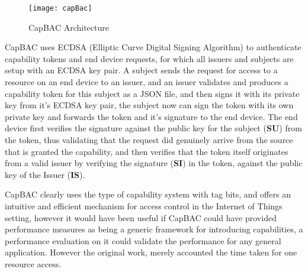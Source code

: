 \begin{figure}[h]
\centering
\texttt{[image: capBac]}
\caption{CapBAC Architecture }
\label{fig:capbac}
\end{figure}

CapBAC uses ECDSA (Elliptic Curve Digital Signing Algorithm) to authenticate capability tokens and end device requests, for which all issuers and subjects are setup with an ECDSA key pair. A subject sends the request for access to a resource on an end device to an issuer, and an issuer validates and produces a capability token for this subject as a JSON file, and then signs it with its private key from it's ECDSA key pair, the subject now can sign the token with its own private key and forwards the token and it's signature to the end device. The end device first verifies the signature against the public key for the subject (\textbf{SU}) from the token, thus validating that the request did genuinely arrive from the source that is granted the capability, and then verifies that the token itself originates from a valid issuer by verifying the signature (\textbf{SI}) in the token, against the public key of the Issuer (\textbf{IS}).

CapBAC clearly uses the type of capability system with tag bits, and offers an intuitive and efficient mechanism for access control in the Internet of Things setting, however it would have been useful if CapBAC could have provided performance measures as being a generic framework for introducing capabilities, a performance evaluation on it could validate the performance for any general application.  However the original work, merely accounted the time taken for one resource access.

